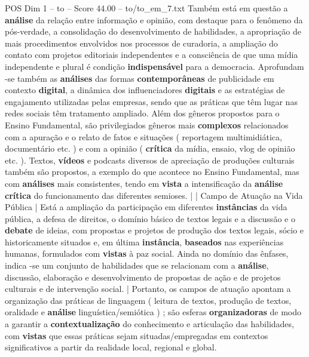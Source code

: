\begin{textsample}{POS Dim 1 – to – Score 44.00 – to/to\_em\_7.txt}
Também está em questão a \textbf{análise} da relação entre informação e opinião, com destaque para o fenômeno da pós-verdade, a consolidação do desenvolvimento de habilidades, a apropriação de mais procedimentos envolvidos nos processos de curadoria, a ampliação do contato com projetos editoriais independentes e a consciência de que uma mídia independente e plural é condição \textbf{indispensável} para a democracia.
Aprofundam -se também as \textbf{análises} das formas \textbf{contemporâneas} de publicidade em contexto \textbf{digital}, a dinâmica dos influenciadores \textbf{digitais} e as estratégias de engajamento utilizadas pelas empresas, sendo que as práticas que têm lugar nas redes sociais têm tratamento ampliado.
Além dos gêneros propostos para o Ensino Fundamental, são privilegiados gêneros mais \textbf{complexos} relacionados com a apuração e o relato de fatos e situações ( reportagem multimidiática, documentário etc. ) e com a opinião ( \textbf{crítica} da mídia, ensaio, vlog de opinião etc. ).
Textos, \textbf{vídeos} e podcasts diversos de apreciação de produções culturais também são propostos, a exemplo do que acontece no Ensino Fundamental, mas com \textbf{análises} mais consistentes, tendo em \textbf{vista} a intensificação da \textbf{análise} \textbf{crítica} do funcionamento das diferentes semioses. | | Campo de Atuação na Vida Pública | Está a ampliação da participação em diferentes \textbf{instâncias} da vida pública, a defesa de direitos, o domínio básico de textos legais e a discussão e o \textbf{debate} de ideias, com propostas e projetos de produção dos textos legais, sócio e historicamente situados e, em última \textbf{instância}, \textbf{baseados} nas experiências humanas, formulados com \textbf{vistas} à paz social.
Ainda no domínio das ênfases, indica -se um conjunto de habilidades que se relacionam com a \textbf{análise}, discussão, elaboração e desenvolvimento de propostas de ação e de projetos culturais e de intervenção social. | Portanto, os campos de atuação apontam a organização das práticas de linguagem ( leitura de textos, produção de textos, oralidade e \textbf{análise} linguística/semiótica ) ; são esferas \textbf{organizadoras} de modo a garantir a \textbf{contextualização} do conhecimento e articulação das habilidades, com \textbf{vistas} que essas práticas sejam situadas/empregadas em contextos significativos a partir da realidade local, regional e global.

\end{textsample}
